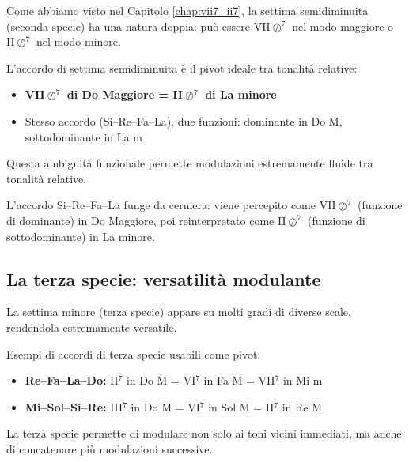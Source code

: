 Come abbiamo visto nel Capitolo \ref{chap:vii7_ii7}, la settima semidiminuita (seconda specie) ha una natura doppia: può essere VII$\oslash^7$ nel modo maggiore o II$\oslash^7$ nel modo minore.

\begin{regola}
	\label{reg:seconda_specie_pivot}
	L'accordo di settima semidiminuita è il pivot ideale tra tonalità relative:
	
	\begin{itemize}
		\item \textbf{VII$\oslash^7$ di Do Maggiore = II$\oslash^7$ di La minore}
		\item Stesso accordo (Si--Re--Fa--La), due funzioni: dominante in Do M, sottodominante in La m
	\end{itemize}
	
	Questa ambiguità funzionale permette modulazioni estremamente fluide tra tonalità relative.
\end{regola}

\begin{esempio}[Modulazione con VII$\oslash^7$ = II$\oslash^7$ come pivot]
	\label{ex:mod_seconda_specie}

	L'accordo Si--Re--Fa--La funge da cerniera: viene percepito come VII$\oslash^7$ (funzione di dominante) in Do Maggiore, poi reinterpretato come II$\oslash^7$ (funzione di sottodominante) in La minore.
\end{esempio}

\subsection{La terza specie: versatilità modulante}
\label{subsec:terza_specie_pivot}

La settima minore (terza specie) appare su molti gradi di diverse scale, rendendola estremamente versatile.

\begin{regola}
	\label{reg:terza_specie_pivot}
	Esempi di accordi di terza specie usabili come pivot:
	
	\begin{itemize}
		\item \textbf{Re--Fa--La--Do:} II$^7$ in Do M = VI$^7$ in Fa M = VII$^7$ in Mi m
		\item \textbf{Mi--Sol--Si--Re:} III$^7$ in Do M = VI$^7$ in Sol M = II$^7$ in Re M
	\end{itemize}
	
	La terza specie permette di modulare non solo ai toni vicini immediati, ma anche di concatenare più modulazioni successive.
\end{regola}


